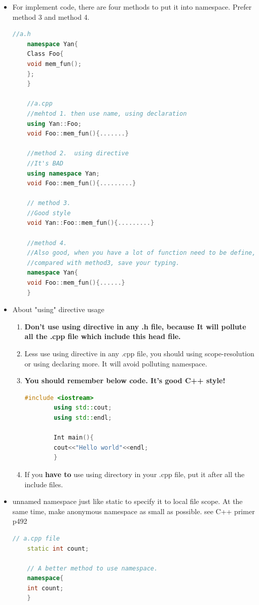 \documentclass[a4paper,12pt,twoside]{book}
\begin{document}
\begin{itemize}
	
	\item For implement code, there are four methods to put it into namespace. Prefer method 3 and method 4.
	
	\begin{lstlisting}[frame=single, language=c++]
	//a.h
	namespace Yan{
	Class Foo{
	void mem_fun();
	};
	}
	
	//a.cpp
	//mehtod 1. then use name, using declaration
	using Yan::Foo;
	void Foo::mem_fun(){.......}
	
	//method 2.  using directive
	//It's BAD
	using namespace Yan;
	void Foo::mem_fun(){.........}
	
	// method 3.
	//Good style
	void Yan::Foo::mem_fun(){.........}
	
	//method 4.
	//Also good, when you have a lot of function need to be define,
	//compared with method3, save your typing.
	namespace Yan{
	void Foo::mem_fun(){......}
	}
	\end{lstlisting}
	
	\item About "using" directive usage
	\begin{enumerate}
		\item  \textbf{Don't use using directive in any .h file,  because It will pollute all the .cpp file which include this head file.}
		
		\item  Less use using directive in any .cpp file, you should using scope-resolution or using declaring more. It will avoid polluting namespace.
		
		\item \textbf{You should remember below code. It's good C++ style!} 
		\begin{lstlisting}[frame=single, language=c++]
		#include <iostream>
		using std::cout;
		using std::endl;
		
		Int main(){
		cout<<"Hello world"<<endl;
		}
		\end{lstlisting}
		
		\item If you \textbf{have to} use using directory in your .cpp file, put it after all the include files.
	\end{enumerate}
	
	\item unnamed namespace just like static to specify it to local file scope. At the same time, make anonymous namespace as small as possible.  see C++ primer p492
	
	\begin{lstlisting}[frame=single, language=c++]
	// a.cpp file
	static int count;
	
	// A better method to use namespace.
	namespace{
	int count;
	}
	\end{lstlisting}
	
\end{itemize}
\end{document}
